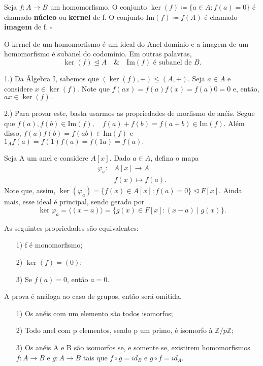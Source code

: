 \documentclass[AlgebraII/algebraII_notes.tex]{subfiles}
\begin{document}
\begin{def*}
	Seja \(f:A\rightarrow B\) um homomorfismo. O conjunto \(\ker{(f)}\coloneqq \{a\in A: f(a) = 0\}\)
	é chamado \textbf{núcleo} ou \textbf{kernel} de f. O conjunto \(\mathrm{Im}(f)\coloneqq f(A)\) é chamado
	\textbf{imagem} de f. \(\square\)
\end{def*}
\begin{lemma*}
	O kernel de um homomorfismo é um ideal do Anel domínio e a imagem de um homomorfismo é subanel do codomínio. Em outras palavras,
	\[
		\ker{(f)}\trianglelefteq{A}\quad\&\quad \mathrm{Im}(f)\text{ é subanel de }B.
	\]
\end{lemma*}
\begin{proof*}
	1.) Da Álgebra I, sabemos que \((\ker{(f)}, +)\leq (A, +).\) Seja \(a\in A\) e
	considere \(x\in\ker{(f)}.\) Note que \(f(ax) = f(a)f(x) = f(a)0 = 0\) e, então, \(ax\in\ker{(f)}.\)

	2.) Para provar este, basta usarmos as propriedades de morfismo de anéis. Segue que
	\(f(a), f(b)\in \mathrm{Im}(f),\quad f(a) + f(b) = f(a+b)\in \mathrm{Im}(f).\) Além disso,
	\(f(a)f(b) = f(ab)\in \mathrm{Im}(f)\) e \(1_{A}f(a) = f(1)f(a) = f(1a) = f(a).\) \qedsymbol
\end{proof*}
\begin{example}
	Seja A um anel e considere \(A[x].\) Dado \(a\in A\), defina o mapa
	\begin{align*}
		\varphi_{a}: & A[x]\rightarrow A \\
		             & f(x)\mapsto f(a).
	\end{align*}
	Note que, assim, \(\ker{(\varphi_{a})} = \{f(x)\in A[x]: f(a) = 0\} \trianglelefteq F[x].\) Ainda mais, esse ideal é principal, sendo gerado por
	\[
		\ker{\varphi_{a}} = \langle (x-a) \rangle = \{g(x)\in F[x]: (x-a)\mid g(x)\}.
	\]
\end{example}
\begin{lemma*}
	As seguintes propriedades são equivalentes:
	\begin{itemize}
		\item[1)] f é monomorfismo;
		\item[2)] \(\ker{(f)} = (0);\)
		\item[3)] Se \(f(a) = 0\), então \(a=0.\)
	\end{itemize}
\end{lemma*}
A prova é análoga ao caso de grupos, então será omitida.
\begin{example}[Exercício]
	\begin{itemize}
		\item[1)] Os anéis com um elemento são todos isomorfos;
		\item[2)] Todo anel com p elementos, sendo p um primo, é isomorfo à \(\mathbb{Z}/p \mathbb{Z};\)
		\item[3)] Os anéis A e B são isomorfos se, e somente se, existirem homomorfismos
		      \(f:A\rightarrow B\) e \(g:A\rightarrow B\) tais que \(f\circ{g}=id_{B}\) e \(g\circ{f} = id_{A}.\)
	\end{itemize}
\end{example}
\end{document}
